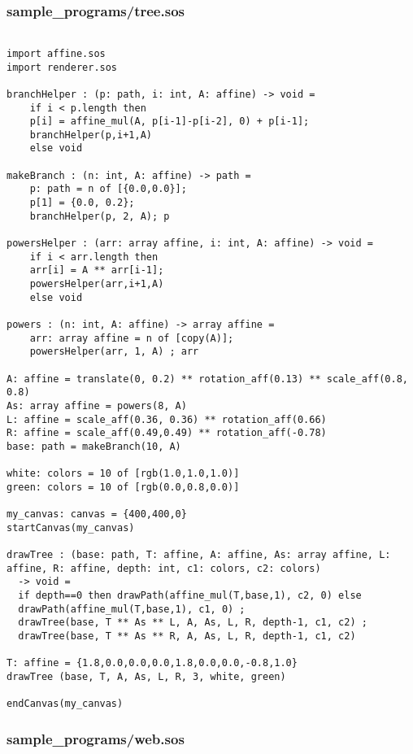 \documentclass[main.tex]{subfiles}
\begin{document}
\subsubsection{sample\_programs/tree.sos}

\begin{lstlisting}

import affine.sos
import renderer.sos

branchHelper : (p: path, i: int, A: affine) -> void = 
    if i < p.length then
    p[i] = affine_mul(A, p[i-1]-p[i-2], 0) + p[i-1];
    branchHelper(p,i+1,A)
    else void

makeBranch : (n: int, A: affine) -> path =
    p: path = n of [{0.0,0.0}];
    p[1] = {0.0, 0.2};
    branchHelper(p, 2, A); p

powersHelper : (arr: array affine, i: int, A: affine) -> void = 
    if i < arr.length then
    arr[i] = A ** arr[i-1];
    powersHelper(arr,i+1,A)
    else void

powers : (n: int, A: affine) -> array affine = 
    arr: array affine = n of [copy(A)];
    powersHelper(arr, 1, A) ; arr

A: affine = translate(0, 0.2) ** rotation_aff(0.13) ** scale_aff(0.8, 0.8)
As: array affine = powers(8, A)
L: affine = scale_aff(0.36, 0.36) ** rotation_aff(0.66)
R: affine = scale_aff(0.49,0.49) ** rotation_aff(-0.78)
base: path = makeBranch(10, A)

white: colors = 10 of [rgb(1.0,1.0,1.0)]
green: colors = 10 of [rgb(0.0,0.8,0.0)]

my_canvas: canvas = {400,400,0}
startCanvas(my_canvas)

drawTree : (base: path, T: affine, A: affine, As: array affine, L: affine, R: affine, depth: int, c1: colors, c2: colors)
  -> void = 
  if depth==0 then drawPath(affine_mul(T,base,1), c2, 0) else
  drawPath(affine_mul(T,base,1), c1, 0) ;
  drawTree(base, T ** As ** L, A, As, L, R, depth-1, c1, c2) ;
  drawTree(base, T ** As ** R, A, As, L, R, depth-1, c1, c2)

T: affine = {1.8,0.0,0.0,0.0,1.8,0.0,0.0,-0.8,1.0}
drawTree (base, T, A, As, L, R, 3, white, green)

endCanvas(my_canvas)

\end{lstlisting}

\subsubsection{sample\_programs/web.sos}
\end{document}
